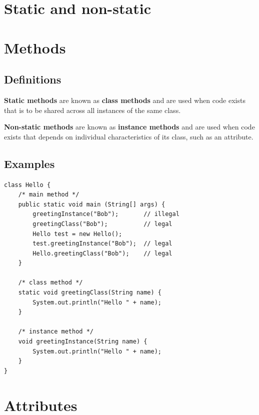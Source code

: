\documentclass[a4paper]{systems-software}
\begin{document}
\section{Static and non-static}

\section*{Methods}

\subsection*{Definitions}

\textbf{Static methods} are known as \textbf{class methods} and are used when code exists that is to be shared across all instances of the same class.

\textbf{Non-static methods} are known as \textbf{instance methods} and are used when code exists that depends on individual characteristics of its class, such as an attribute.


\subsection*{Examples}

\begin{lstlisting}[title={Class containing a static and non-static method.}]
class Hello {
	/* main method */
	public static void main (String[] args) {
		greetingInstance("Bob");       // illegal
		greetingClass("Bob");          // legal
		Hello test = new Hello();
		test.greetingInstance("Bob");  // legal
		Hello.greetingClass("Bob");    // legal
	}
	
	/* class method */
	static void greetingClass(String name) {
		System.out.println("Hello " + name);
	}
	
	/* instance method */
	void greetingInstance(String name) {
		System.out.println("Hello " + name);
	}
}
\end{lstlisting}


\section*{Attributes}
\end{document}
